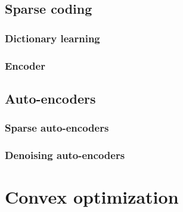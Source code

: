 \documentclass[a4paper,12pt,twoside]{report}
\begin{document}
\section{Sparse coding}

\subsection{Dictionary learning}

\subsection{Encoder}

\section{Auto-encoders}

\subsection{Sparse auto-encoders}

\subsection{Denoising auto-encoders}

\chapter{Convex optimization}
\end{document}
